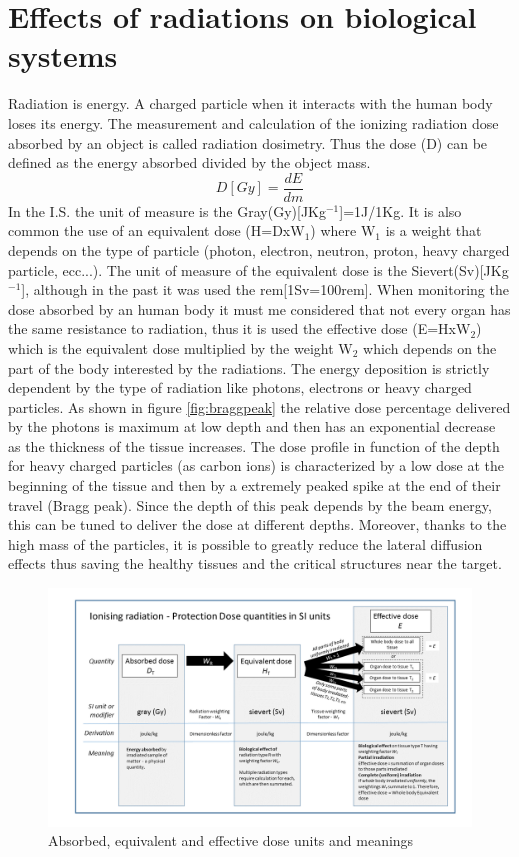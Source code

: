 \section{Effects of radiations on biological systems}
Radiation is energy. A charged particle when it interacts with the human body loses its energy. The measurement and calculation of the ionizing radiation dose absorbed by an object is called radiation dosimetry.
\newline
Thus the dose (D) can be defined as the energy absorbed divided by the object mass.
\begin{equation}\label{eq:dose}
	D\left[Gy \right] =\frac{dE}{dm}
\end{equation}
In the I.S. the unit of measure is the Gray(Gy)[JKg${}^{-1}$]=1J/1Kg.
\newline
It is also common the use of an equivalent dose (H=DxW$_1$) where W$_1$ is a weight that depends on the type of particle (photon, electron, neutron, proton, heavy charged particle, ecc...). The unit of measure of the equivalent dose is the Sievert(Sv)[JKg${}^{-1}$], although in the past it was used the rem[1Sv=100rem].
\newline
When monitoring the dose absorbed by an human body it must me considered that not every organ has the same resistance to radiation, thus it is used the effective dose (E=HxW$_2$) which is the equivalent dose multiplied by the weight W$_2$ which depends on the part of the body interested by the radiations.
\newline
\noindent The energy deposition is strictly dependent by the type of radiation like photons, electrons or heavy charged particles. As shown in figure \ref{fig:braggpeak} the relative dose percentage delivered by the photons is maximum at low depth and then has an exponential decrease as the thickness of the tissue increases.
The dose profile in function of the depth for heavy charged particles (as carbon ions) is characterized by a low dose at the beginning of the tissue and then by a extremely peaked spike at the end of their travel (Bragg peak).
Since the depth of this peak depends by the beam energy, this can be tuned to deliver the dose at different depths.
Moreover, thanks to the high mass of the particles, it is possible to greatly reduce the lateral diffusion effects thus saving the healthy tissues and the critical structures near the target.
\begin{figure}[H]
	\centering
	\includegraphics[width=0.7\linewidth]{IMG/ch1/SIRadiationDoseUnits}
	\caption{Absorbed, equivalent and effective dose units and meanings}
	\label{fig:SIRadiationDoseUnits}
\end{figure} 
